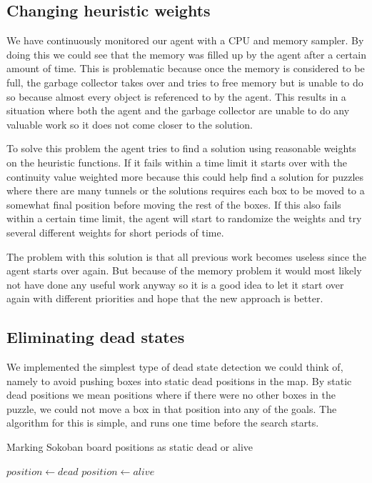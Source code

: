 \documentclass[a4paper,11pt]{article}
\begin{document}
\subsection{Changing heuristic weights}
We have continuously monitored our agent with a CPU and memory sampler.
By doing this we could see that the memory was filled up by the agent after a certain amount of time. 
This is problematic because once the memory is considered to be full,
the garbage collector takes over and tries to free
memory but is unable to do so because almost every object is referenced to by the agent. 
This results in a situation where both the agent and the garbage 
collector are unable to do any valuable work so it does not come closer to the solution. 

To solve this problem the agent tries to find a solution using reasonable weights on the heuristic functions.
If it fails within a time limit it starts over with the continuity value weighted more because this could help 
find a solution for puzzles where there are many tunnels or the solutions requires each box to be moved to
a somewhat final position before moving the rest of the boxes.
If this also fails within a certain time limit, the agent will start to randomize 
the weights and try several different weights for short periods of time.

The problem with this solution is that all previous work becomes useless since the agent starts over again.
But because of the memory problem it would most likely not have done any useful work anyway so
it is a good idea to let it start over again with different priorities
and hope that the new approach is better.

\subsection{Eliminating dead states}

\label{sec:dead}

We implemented the simplest type of dead state detection we could think of,
namely to avoid pushing boxes into static dead positions in the map.
By static dead positions we mean positions where if there were no other boxes in the puzzle,
we could not move a box in that position into any of the goals.
The algorithm for this is simple, and runs one time before the search starts.

\begin{algorithm}
\caption{Marking Sokoban board positions as static dead or alive}
\label{alg:dead_positions}
\begin{algorithmic}
			\State $position \gets dead$
		\EndFor
					\State $position \gets alive$
				\EndIf
			\EndFor
		\EndFor
	\EndFunction
\end{algorithmic}
\end{algorithm}
\end{document}
